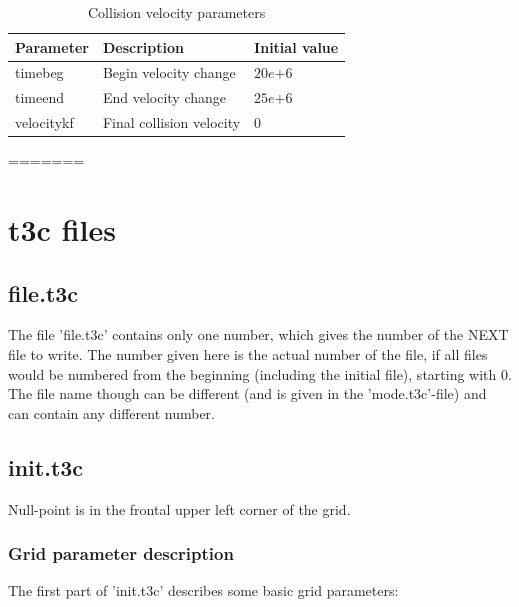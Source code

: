\begin{table}[H]
\small
\centering
\begin{tabular}{l l l}
\toprule
Parameter & Description & Initial value \\
\midrule
timebeg 	& Begin velocity change & $20e{+6}$\\
timeend 	& End velocity change & $25e{+6}$\\
velocitykf 	& Final collision velocity & $0$\\
\bottomrule
\end{tabular}
\caption{Collision velocity parameters}
\label{tbl:mode_collision_parameters}
=======

\section{t3c files}

\subsection{file.t3c}
The file 'file.t3c' contains only one number, which gives the number of the NEXT file to write.
The number given here is the actual number of the file, if all files would be numbered from the beginning (including the initial file), starting with 0.
The file name though can be different (and is given in the 'mode.t3c'-file) and can contain any different number.

\subsection{init.t3c}
Null-point is in the frontal upper left corner of the grid.

\subsubsection{Grid parameter description}

The first part of 'init.t3c' describes some basic grid parameters:


\end{table}
